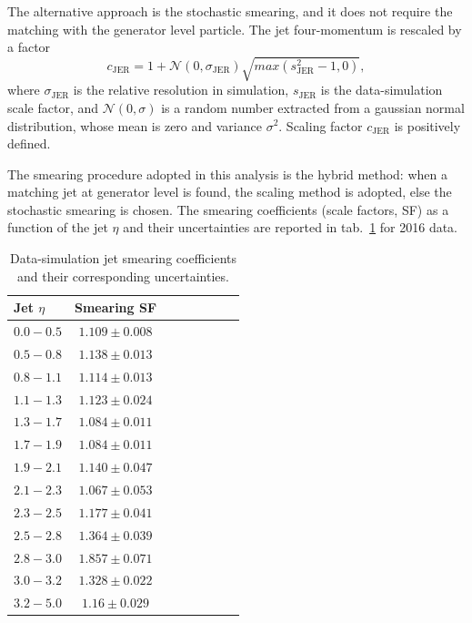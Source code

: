 \noindent The alternative approach is the stochastic smearing, and it does not require the matching with the generator level particle. The jet four-momentum is rescaled by a factor
\begin{equation}
c_{\text{JER}} = 1 + \mathcal{N}(0, \sigma_{\text{JER}}) \sqrt{max(s_{\text{JER}}^2 - 1, 0)},
\end{equation}
where $\sigma_{\text{JER}}$ is the relative \pt resolution in simulation, $s_{\text{JER}}$ is the data-simulation scale factor, and $\mathcal{N}(0, \sigma)$ 
is a random number extracted from a gaussian normal distribution, whose mean is zero and variance $\sigma^2$. Scaling factor $c_{\text{JER}}$ is positively defined.%

\noindent The smearing procedure adopted in this analysis is the hybrid method: when a matching jet at generator level is found, the scaling method is adopted, else the stochastic smearing is chosen. The smearing coefficients (scale factors, SF) as a function of the jet $\eta$ and their uncertainties are reported in tab.~\ref{tab:smear} for 2016 data.

\begin{table}[!htb]
  \centering
  \begin{tabular}{l|ccccccc}
    Jet $\eta$ & Smearing SF \\
    \hline
    $0.0-0.5$ & $1.109 \pm 0.008$ \\
    $0.5-0.8$ & $1.138 \pm 0.013$ \\
    $0.8-1.1$ & $1.114 \pm 0.013$ \\
    $1.1-1.3$ & $1.123 \pm 0.024$ \\
    $1.3-1.7$ & $1.084 \pm 0.011$ \\
    $1.7-1.9$ & $1.084 \pm 0.011$ \\
    $1.9-2.1$ & $1.140 \pm 0.047$ \\
    $2.1-2.3$ & $1.067 \pm 0.053$ \\
    $2.3-2.5$ & $1.177 \pm 0.041$ \\
    $2.5-2.8$ & $1.364 \pm 0.039$ \\
    $2.8-3.0$ & $1.857 \pm 0.071$ \\
    $3.0-3.2$ & $1.328 \pm 0.022$ \\
    $3.2-5.0$ & $1.16  \pm 0.029$ \\
  \end{tabular}
  
  \caption{Data-simulation jet smearing coefficients and their corresponding uncertainties.}
  \label{tab:smear}
\end{table}

